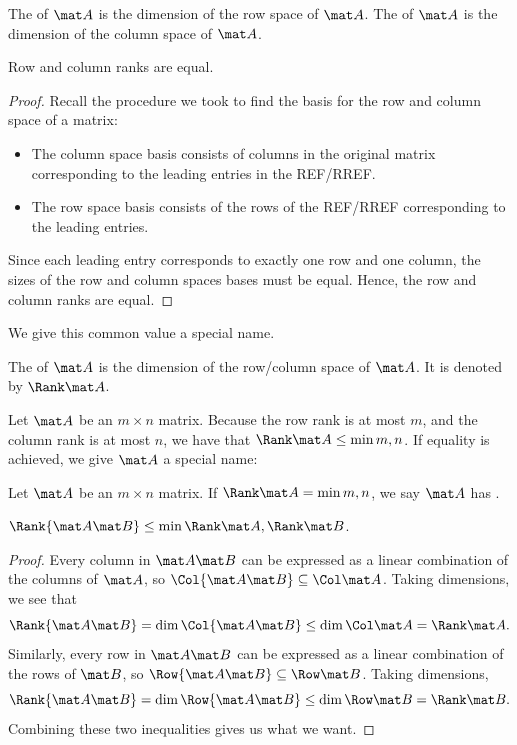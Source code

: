 \begin{definition}
    The  of $\mat A$ is the dimension of the row space of $\mat A$. The  of $\mat A$ is the dimension of the column space of $\mat A$.
\end{definition}

\begin{proposition}
    Row and column ranks are equal.
\end{proposition}
\begin{proof}
    Recall the procedure we took to find the basis for the row and column space of a matrix:
    \begin{itemize}
        \item The column space basis consists of columns in the original matrix corresponding to the leading entries in the REF/RREF.
        \item The row space basis consists of the rows of the REF/RREF corresponding to the leading entries.
    \end{itemize}
    Since each leading entry corresponds to exactly one row and one column, the sizes of the row and column spaces bases must be equal. Hence, the row and column ranks are equal.
\end{proof}

We give this common value a special name.

\begin{definition}
    The  of $\mat A$ is the dimension of the row/column space of $\mat A$. It is denoted by $\Rank \mat A$.
\end{definition}

Let $\mat A$ be an $m \times n$ matrix. Because the row rank is at most $m$, and the column rank is at most $n$, we have that $\Rank \mat A \leq \min{m, n}$. If equality is achieved, we give $\mat A$ a special name:

\begin{definition}
    Let $\mat A$ be an $m \times n$ matrix. If $\Rank \mat A = \min{m, n}$, we say $\mat A$ has .
\end{definition}

\begin{proposition}
    $\Rank{\mat A \mat B} \leq \min{\Rank \mat A, \Rank \mat B}$.
\end{proposition}
\begin{proof}
    Every column in $\mat A \mat B$ can be expressed as a linear combination of the columns of $\mat A$, so $\Col{\mat A \mat B} \subseteq \Col \mat A$. Taking dimensions, we see that \[\Rank{\mat A \mat B} = \dim \Col{\mat A \mat B} \leq \dim \Col \mat A = \Rank \mat A.\] Similarly, every row in $\mat A \mat B$ can be expressed as a linear combination of the rows of $\mat B$, so $\Row{\mat A \mat B} \subseteq \Row \mat B$. Taking dimensions, \[\Rank{\mat A \mat B} = \dim \Row{\mat A \mat B} \leq \dim \Row \mat B = \Rank \mat B.\] Combining these two inequalities gives us what we want.
\end{proof}

